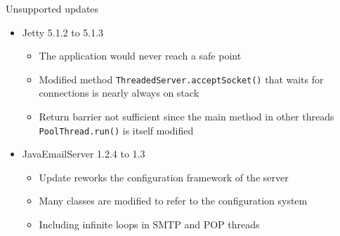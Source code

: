 \begin{frame}{Unsupported updates}%
\begin{itemize}
\item Jetty 5.1.2 to 5.1.3
  \begin{itemize}
  \item The application would never reach a safe point
  \item Modified method {\tt ThreadedServer.acceptSocket()} that waits for
        connections is nearly always on stack
  \item Return barrier not sufficient since the main method in other
        threads {\tt PoolThread.run()} is itself modified
  \end{itemize}
\item JavaEmailServer 1.2.4 to 1.3
  \begin{itemize}
  \item Update reworks the configuration framework of the server
  \item Many classes are modified to refer to the configuration system
  \item Including infinite loops in SMTP and POP threads
  \end{itemize}
\end{itemize}
\end{frame}
